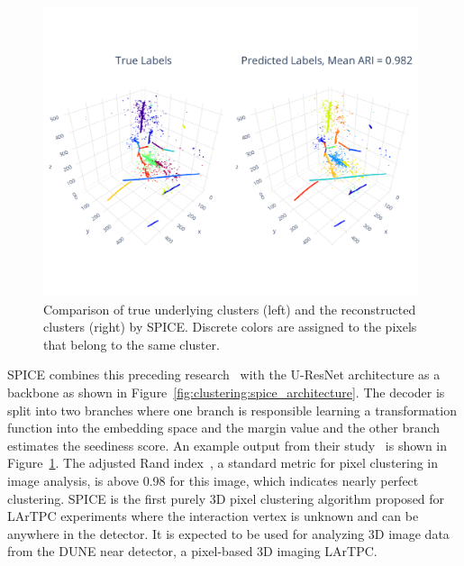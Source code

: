 \documentclass{ws-rv9x6}
\begin{document}
\begin{figure}[t]
    \centering
    \includegraphics[width=0.98\textwidth,trim=0cm 3cm 0cm 3cm, clip]{figures/prediction_5.pdf}
    \caption{Comparison of true underlying clusters (left) and the reconstructed clusters (right) by SPICE. Discrete colors are assigned to the pixels that belong to the same cluster.  }
    \label{fig:clustering:spice_clustering}
\end{figure}

SPICE combines this  preceding research~\cite{disc,8953222} with the U-ResNet architecture as a backbone as shown in Figure~\ref{fig:clustering:spice_architecture}. The decoder is split into two branches where one branch is responsible learning a transformation function into the embedding space and the margin value and the other branch estimates the seediness score. An example output from their study~\cite{koh2020scalable} is shown in Figure~\ref{fig:clustering:spice_clustering}. The adjusted Rand index~\cite{ari}, a standard metric for pixel clustering in image analysis, is above 0.98 for this image, which indicates nearly perfect clustering. SPICE is the first purely 3D pixel clustering algorithm proposed for LArTPC experiments where the interaction vertex is unknown and can be anywhere in the detector. It is expected to be used for analyzing 3D image data from the DUNE near detector, a pixel-based 3D imaging LArTPC.
\end{document}
